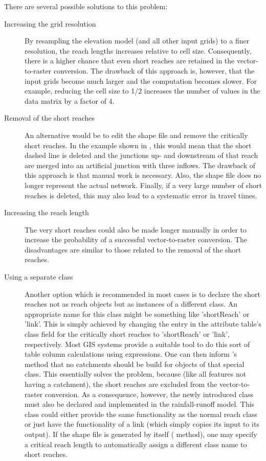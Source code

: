 There are several possible solutions to this problem:
\begin{description}
  \item [Increasing the grid resolution] By resampling the elevation model (and all other input grids) to a finer resolution, the reach lengths increases relative to cell size. Consequently, there is a higher chance that even short reaches are retained in the vector-to-raster conversion. The drawback of this approach is, however, that the input grids become much larger and the computation becomes slower. For example, reducing the cell size to 1/2 increases the number of values in the data matrix by a factor of 4.
  \item [Removal of the short reaches] An alternative would be to edit the shape file and remove the critically short reaches. In the example shown in , this would mean that the short dashed line is deleted and the junctions up- and downstream of that reach are merged into an artificial junction with three inflows. The drawback of this approach is that manual work is necessary. Also, the shape file does no longer represent the actual network. Finally, if a very large number of short reaches is deleted, this may also lead to a systematic error in travel times.
  \item [Increasing the reach length] The very short reaches could also be made longer manually in order to increase the probability of a successful vector-to-raster conversion. The disadvantages are similar to those related to the removal of the short reaches.
  \item [Using a separate class] Another option which is recommended in most cases is to declare the short reaches not as reach objects but as instances of a different class. An appropriate name for this class might be something like 'shortReach' or 'link'. This is simply achieved by changing the entry in the attribute table's class field for the critically short reaches to 'shortReach' or 'link', respectively. Most GIS systems provide a suitable tool to do this sort of table column calculations using expressions. One can then inform 's  method that no catchments should be build for objects of that special class. This essentially solves the problem, because (like all features not having a catchment), the short reaches are excluded from the vector-to-raster conversion. As a consequence, however, the newly introduced class must also be declared and implemented in the rainfall-runoff model. This class could either provide the same functionality as the normal reach class or just have the functionality of a link (which simply copies its input to its output). If the shape file is generated by  itself ( method), one may specify a critical reach length to automatically assign a different class name to short reaches.
\end{description}


